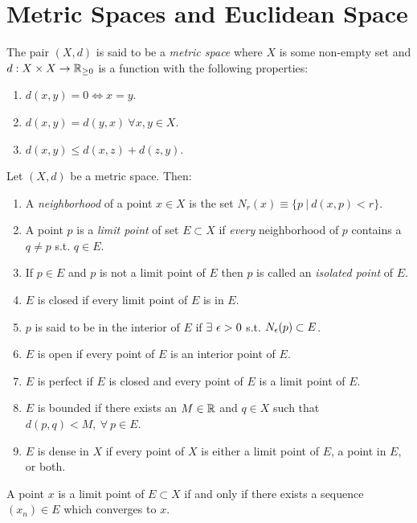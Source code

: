 \section{Metric Spaces and Euclidean Space}
\begin{definition}
  The pair $(X,d)$ is said to be a \textit{metric space} where $X$ is some non-empty set and $d:X\times X\to \mathbb{R}_{\geq 0}$ is a function with the following properties:
\begin{enumerate}
  \item $d(x,y) = 0 \iff x = y$.
  \item $d(x,y) = d(y,x)\ \forall x,y\in X$.
  \item $d(x,y) \leq d(x,z) + d(z,y)$.
\end{enumerate}
\end{definition}
\begin{definition}
  Let $(X,d)$ be a metric space. Then:
  \begin{enumerate}
    \item A \textit{neighborhood} of a point $x\in X$ is the set $N_r(x) \equiv \{p\ |\ d(x,p) <r\}$.
    \item A point $p$ is a \textit{limit point} of set $E\subset X$ if \textit{every} neighborhood of $p$ contains a $q\neq p$ s.t. $q\in E$.
    \item If $p\in E$ and $p$ is not a limit point of $E$ then $p$ is called an \textit{isolated point} of $E$.
    \item $E$ is closed if every limit point of $E$ is in $E$.
    \item $p$ is said to be in the interior of $E$ if $\exists\ \epsilon>0$ s.t. $N_\epsilon(p)\subset E$.
    \item $E$ is open if every point of $E$ is an interior point of $E$.
    \item $E$ is perfect if $E$ is closed and every point of $E$ is a limit point of $E$.
    \item $E$ is bounded if there exists an $M\in \mathbb{R}$ and $q\in X$ such that $d(p,q) < M,\ \forall\ p\in E$.
    \item $E$ is dense in $X$ if every point of $X$ is either a limit point of $E$, a point in $E$, or both.
  \end{enumerate}
\end{definition}
\begin{proposition}
  A point $x$ is a limit point of $E\subset X$ if and only if there exists a sequence $(x_n)\in E$ which converges to $x$.
\end{proposition}
